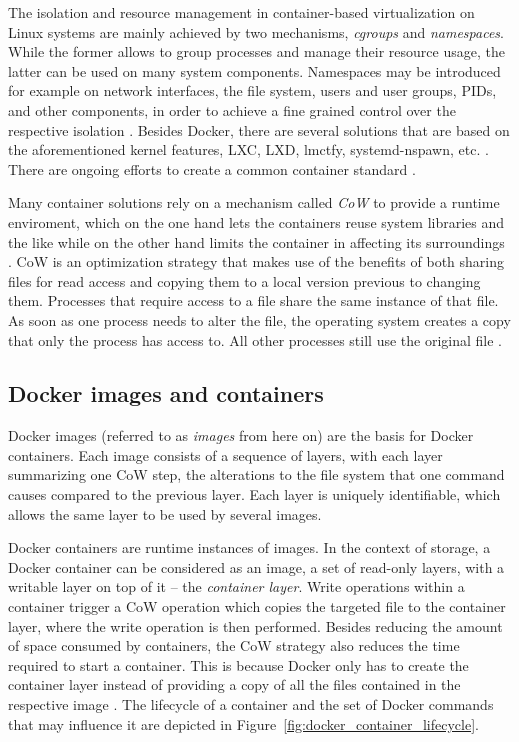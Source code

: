     The isolation and resource management in container-based virtualization on Linux systems are mainly achieved by two mechanisms, \emph{\ac{cgroups}} and \emph{namespaces}. While the former allows to group processes and manage their resource usage, the latter can be used on many system components. Namespaces may be introduced for example on network interfaces, the file system, users and user groups, \acp{PID}, and other components, in order to achieve a fine grained control over the respective isolation \cite{Ruiz2015Performance}.
    Besides Docker, there are several solutions that are based on the aforementioned kernel features, \eg LXC, LXD, lmctfy, systemd-nspawn, etc. \cite{Ruiz2015Performance}. There are ongoing efforts to create a common container standard \cite{Initiative????Open}.

    Many container solutions rely on a mechanism called \emph{\ac{CoW}} to provide a runtime enviroment, which on the one hand lets the containers reuse system libraries and the like while on the other hand limits the container in affecting its surroundings \cite{Docker2016Docker,Pahl2015Containerization}.
    \ac{CoW} is an optimization strategy that makes use of the benefits of both sharing files for read access and copying them to a local version previous to changing them. Processes that require access to a file share the same instance of that file. As soon as one process needs to alter the file, the operating system creates a copy that only the process has access to. All other processes still use the original file \cite{Pahl2015Containerization,Docker2016Docker}.

  \subsection{Docker images and containers} %
  \label{sub:docker_images_and_containers}
    Docker images (referred to as \emph{images} from here on) are the basis for Docker containers. Each image consists of a sequence of layers, with each layer summarizing one \ac{CoW} step, \ie the alterations to the file system that one command causes compared to the previous layer. Each layer is uniquely identifiable, which allows the same layer to be used by several images.

    Docker containers are runtime instances of images.
    In the context of storage, a Docker container can be considered as an image, \ie a set of read-only layers, with a writable layer on top of it -- the \emph{container layer}. Write operations within a container trigger a \ac{CoW} operation which copies the targeted file to the container layer, where the write operation is then performed.
    Besides reducing the amount of space consumed by containers, the \ac{CoW} strategy also reduces the time required to start a container. This is because Docker only has to create the container layer instead of providing a copy of all the files contained in the respective image \cite{Docker2016Docker}. The lifecycle of a container and the set of Docker commands that may influence it are depicted in Figure~\ref{fig:docker_container_lifecycle}.

